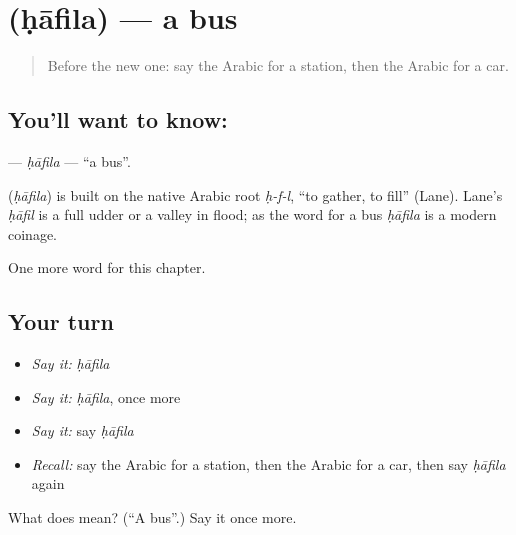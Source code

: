 \section[\texorpdfstring{\ar{حافلة} (ḥāfila)}{حافلة (ḥāfila)}]{ (ḥāfila) — a bus}

\label{lesson:AR-C91-hafila}



\begin{quote}
Before the new one: say the Arabic for a station, then the Arabic for a car.
\end{quote}

\subsection*{You'll want to know: }
\textbf{} — \emph{ḥāfila} — \textquotedblleft{}a bus\textquotedblright{}.

\begin{cousinweb}
\textbf{} (\emph{ḥāfila}) is built on the native Arabic root \emph{ḥ-f-l}, \textquotedblleft{}to gather, to fill\textquotedblright{} (Lane). Lane's \emph{ḥāfil} is a full udder or a valley in flood; as the word for a bus \emph{ḥāfila} is a modern coinage.
\end{cousinweb}

\begin{grammarlens}[title={What you've built}]
One more word for this chapter.
\end{grammarlens}

\subsection*{Your turn}
\begin{itemize}
\raggedright
  \item \emph{Say it:} \emph{ḥāfila}
  \item \emph{Say it:} \emph{ḥāfila}, once more
  \item \emph{Say it:} say \emph{ḥāfila}
  \item \emph{Recall:} say the Arabic for a station, then the Arabic for a car, then say \emph{ḥāfila} again
\end{itemize}

\begin{tcolorbox}[breakable,colback=teal!4,colframe=teal!35!black,title={Before you move on}]
What does  mean? (\textquotedblleft{}A bus\textquotedblright{}.) Say it once more.
\end{tcolorbox}
